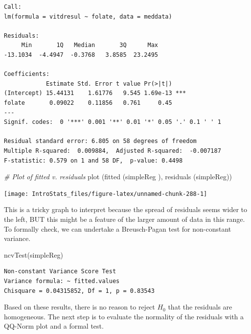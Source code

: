 \documentclass[
  oneside]{krantz}
\newenvironment{Shaded}{\begin{snugshade}}{\end{snugshade}}
\newcommand{\CommentTok}[1]{\textcolor[rgb]{0.56,0.35,0.01}{\textit{#1}}}
\newcommand{\FunctionTok}[1]{\textcolor[rgb]{0.00,0.00,0.00}{#1}}
\newcommand{\NormalTok}[1]{#1}
\begin{document}
\begin{verbatim}
Call:
lm(formula = vitdresul ~ folate, data = meddata)

Residuals:
     Min       1Q   Median       3Q      Max 
-13.1034  -4.4947  -0.3768   3.8585  23.2495 

Coefficients:
            Estimate Std. Error t value Pr(>|t|)    
(Intercept) 15.44131    1.61776   9.545 1.69e-13 ***
folate       0.09022    0.11856   0.761     0.45    
---
Signif. codes:  0 '***' 0.001 '**' 0.01 '*' 0.05 '.' 0.1 ' ' 1

Residual standard error: 6.805 on 58 degrees of freedom
Multiple R-squared:  0.009884,  Adjusted R-squared:  -0.007187 
F-statistic: 0.579 on 1 and 58 DF,  p-value: 0.4498
\end{verbatim}

\begin{Shaded}
\begin{Highlighting}[]
\CommentTok{\# Plot of fitted v. residuals }
\FunctionTok{plot}\NormalTok{ (}\FunctionTok{fitted}\NormalTok{ (simpleReg ), }\FunctionTok{residuals}\NormalTok{ (simpleReg))}
\end{Highlighting}
\end{Shaded}

\begin{center}\texttt{[image: IntroStats\_files/figure-latex/unnamed-chunk-288-1]} \end{center}

This is a tricky graph to interpret because the spread of residuals seems wider to the left, BUT this might be a feature of the larger amount of data in this range. To formally check, we can undertake a Breusch-Pagan test for non-constant variance.

\begin{Shaded}
\begin{Highlighting}[]
\FunctionTok{ncvTest}\NormalTok{(simpleReg)}
\end{Highlighting}
\end{Shaded}

\begin{verbatim}
Non-constant Variance Score Test 
Variance formula: ~ fitted.values 
Chisquare = 0.04315852, Df = 1, p = 0.83543
\end{verbatim}

Based on these results, there is no reason to reject \(H_0\) that the residuals are homogeneous. The next step is to evaluate the normality of the residuals with a QQ-Norm plot and a formal test.
\end{document}
